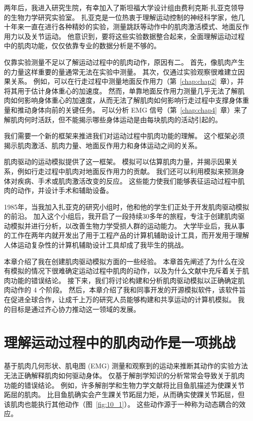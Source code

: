 两年后，我进入研究生院，有幸加入了斯坦福大学设计组由费利克斯$\cdot$扎亚克领导的生物力学研究实验室。
扎亚克是一位热衷于理解运动控制的神经科学家，他几十年来一直在进行各种精妙的实验，测量跳跃等动作中的肌肉激活模式、地面反作用力以及关节运动。
他意识到，要将这些实验数据整合起来，全面理解运动过程中的肌肉功能，仅仅依靠专业的数据分析是不够的。


仅靠实验测量不足以了解运动过程中的肌肉动作，原因有二。
首先，像肌肉产生的力量这样重要的量通常无法在实验中测量。
其次，仅通过实验观察很难建立因果关系。
例如，可以在行走过程中测量地面反作用力（第~\ref{chap:chap2}~章），并将其用于估计身体重心的加速度。
然而，单靠地面反作用力测量几乎无法了解肌肉如何影响身体重心的加速度，从而无法了解肌肉如何影响行走过程中支撑身体重量和推动身体向前的关键任务。
可以分析 EMG 信号（第~\ref{chap:chap4}~章）来了解肌肉何时活跃，但不能揭示哪些身体运动是由每块肌肉的活动引起的。


我们需要一个新的框架来推进我们对运动过程中肌肉功能的理解。
这个框架必须揭示肌肉激活、肌肉力量、地面反作用力和身体运动之间的关系。


肌肉驱动的运动模拟提供了这一框架。
模拟可以估算肌肉力量，并揭示因果关系，例如行走过程中肌肉对地面反作用力的贡献。
我们还可以利用模拟来预测身体对疾病、手术或肌肉激活改变的反应。
这些能力使我们能够表征运动过程中肌肉的动作，并设计手术和辅助设备。


1985年，当我加入扎亚克的研究小组时，他和他的学生们正处于开发肌肉驱动模拟的前沿。
加入这个小组后，我开启了一段持续30多年的旅程，专注于创建肌肉驱动模拟并进行分析，以改善生物力学受损人群的运动能力。
大学毕业后，我从事的工作在两年内就开发出了用于工程产品的计算机辅助设计工具，而开发用于理解人体运动复杂性的计算机辅助设计工具却成了我毕生的挑战。


本章介绍了我在创建肌肉驱动模拟方面的一些经验。
本章首先阐述了为什么在没有模拟的情况下很难确定运动过程中肌肉的动作，以及为什么文献中充斥着关于肌肉功能的错误结论。
接下来，我们将讨论构建和分析肌肉驱动模拟以正确确定肌肉动作的 4 个阶段。
然后，本章介绍了我和同事开发的开源模拟软件，该软件旨在促进全球合作，让成千上万的研究人员能够构建和共享运动的计算机模拟。
我的目标是通过齐心协力推动这一领域的发展。


\section{理解运动过程中的肌肉动作是一项挑战}

基于肌肉几何形状、肌电图 (EMG) 测量和观察到的运动来推断其动作的实验方法无法正确解释肌肉如何驱动身体。
仅基于解剖学知识的分析常常会导致关于肌肉功能的错误结论。
例如，许多解剖学和生物力学文献将比目鱼肌描述为使踝关节跖屈的肌肉。
比目鱼肌确实会产生踝关节跖屈力矩，从而确实使踝关节跖屈，但该肌肉也能执行其他动作（图~\ref{fig:10_1}）。
这些动作源于一种称为动态耦合的效应。

